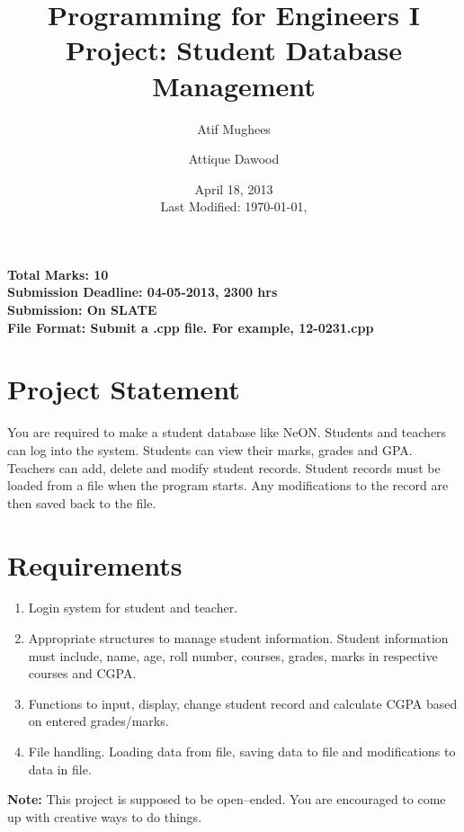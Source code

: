 \documentclass[12pt,a4paper]{article}
\title{\vspace{-2cm}Programming for Engineers I\\Project: Student Database Management}
\author{Atif Mughees\and Attique Dawood}
\date{April 18, 2013\\[0.2cm] Last Modified: \today, \currenttime}
\begin{document}
\maketitle
\noindent\textbf{Total Marks: 10}\\
\noindent\textbf{Submission Deadline: 04-05-2013, 2300 hrs}\\
\noindent\textbf{Submission: On SLATE}\\
\noindent\textbf{File Format: Submit a .cpp file. For example, 12-0231.cpp}\\
\section{Project Statement}
You are required to make a student database like NeON. Students and teachers can log into the system. Students can view their marks, grades and GPA. Teachers can add, delete and modify student records. Student records must be loaded from a file when the program starts. Any modifications to the record are then saved back to the file.
\section{Requirements}
\begin{enumerate}
\item Login system for student and teacher.
\item Appropriate structures to manage student information. Student information must include, name, age, roll number, courses, grades, marks in respective courses and CGPA.
\item Functions to input, display, change student record and calculate CGPA based on entered grades/marks. 
\item File handling. Loading data from file, saving data to file and modifications to data in file.
\end{enumerate}
\textbf{Note:} This project is supposed to be open--ended. You are encouraged to come up with creative ways to do things.
\end{document}
